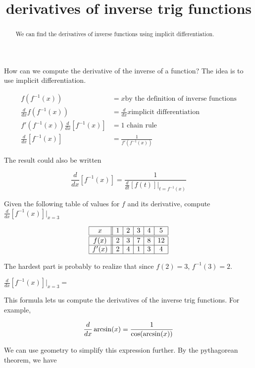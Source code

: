 \documentclass{ximera}
\title{derivatives of inverse trig functions}
\begin{document}
\begin{abstract}
 We can find the derivatives of inverse functions using implicit differentiation.
\end{abstract}

\maketitle

How can we compute the derivative of the inverse of a function? The idea is to use implicit differentiation. 

\begin{align*}
	f(f^{-1}(x)) &= x\text{by the definition of inverse functions} \\
	\frac{d}{dx} f(f^{-1}(x)) &=  \frac{d}{dx} x \text{implicit differentiation}\\
	 f'(f^{-1}(x))\frac{d}{dx}[ f^{-1}(x)] &= 1 \text{ chain rule}\\
	 \frac{d}{dx}[ f^{-1}(x)] &= \frac{1}{f'(f^{-1}(x))}
\end{align*}

The result could also be written 

\[
\frac{d}{dx}[ f^{-1}(x)] = \frac{1}{\frac{d}{dt}\left[f(t)\right]\big|_{t=f^{-1}(x)}}
\]

\begin{question}
	Given the following table of values for $f$ and its derivative, compute $\frac{d}{dx}\left[ f^{-1}(x)\right]\big|_{x=3}$
	
	\[
\begin{array}{|c||c|c|c|c|c|}
\hline
 x    & 1 & 2 & 3 & 4 & 5 \\ \hline \hline 
f(x)  & 2 & 3 & 7 & 8 & 12 \\ \hline
f'(x) & 2 & 4 & 1 & 3 & 4 \\ \hline
\end{array}
\]
	\begin{hint}
		The hardest part is probably to realize that since $f(2)=3$, $f^{-1}(3)=2$.
	\end{hint}
	$\frac{d}{dx}\left[ f^{-1}(x)\right]\big|_{x=3} = $ 


\end{question}

This formula lets us compute the derivatives of the inverse trig functions.  For example,

\[
	\frac{d}{dx} \arcsin(x) = \frac{1}{\cos(\arcsin(x))}\\
\]

We can use geometry to simplify this expression further.  By the pythagorean theorem, we have
\end{document}
